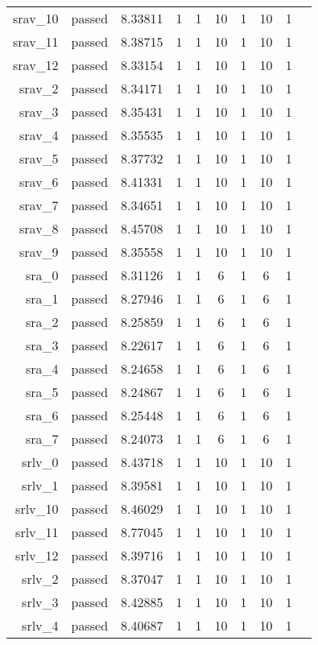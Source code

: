 \begin{longtable}{r|ccccccccc}
    srav\_10 & passed & 8.33811 & 1 & 1 & 10 & 1 & 10 & 1 \\
    srav\_11 & passed & 8.38715 & 1 & 1 & 10 & 1 & 10 & 1 \\
    srav\_12 & passed & 8.33154 & 1 & 1 & 10 & 1 & 10 & 1 \\
    srav\_2 & passed & 8.34171 & 1 & 1 & 10 & 1 & 10 & 1 \\
    srav\_3 & passed & 8.35431 & 1 & 1 & 10 & 1 & 10 & 1 \\
    srav\_4 & passed & 8.35535 & 1 & 1 & 10 & 1 & 10 & 1 \\
    srav\_5 & passed & 8.37732 & 1 & 1 & 10 & 1 & 10 & 1 \\
    srav\_6 & passed & 8.41331 & 1 & 1 & 10 & 1 & 10 & 1 \\
    srav\_7 & passed & 8.34651 & 1 & 1 & 10 & 1 & 10 & 1 \\
    srav\_8 & passed & 8.45708 & 1 & 1 & 10 & 1 & 10 & 1 \\
    srav\_9 & passed & 8.35558 & 1 & 1 & 10 & 1 & 10 & 1 \\
    sra\_0 & passed & 8.31126 & 1 & 1 & 6 & 1 & 6 & 1 \\
    sra\_1 & passed & 8.27946 & 1 & 1 & 6 & 1 & 6 & 1 \\
    sra\_2 & passed & 8.25859 & 1 & 1 & 6 & 1 & 6 & 1 \\
    sra\_3 & passed & 8.22617 & 1 & 1 & 6 & 1 & 6 & 1 \\
    sra\_4 & passed & 8.24658 & 1 & 1 & 6 & 1 & 6 & 1 \\
    sra\_5 & passed & 8.24867 & 1 & 1 & 6 & 1 & 6 & 1 \\
    sra\_6 & passed & 8.25448 & 1 & 1 & 6 & 1 & 6 & 1 \\
    sra\_7 & passed & 8.24073 & 1 & 1 & 6 & 1 & 6 & 1 \\
    srlv\_0 & passed & 8.43718 & 1 & 1 & 10 & 1 & 10 & 1 \\
    srlv\_1 & passed & 8.39581 & 1 & 1 & 10 & 1 & 10 & 1 \\
    srlv\_10 & passed & 8.46029 & 1 & 1 & 10 & 1 & 10 & 1 \\
    srlv\_11 & passed & 8.77045 & 1 & 1 & 10 & 1 & 10 & 1 \\
    srlv\_12 & passed & 8.39716 & 1 & 1 & 10 & 1 & 10 & 1 \\
    srlv\_2 & passed & 8.37047 & 1 & 1 & 10 & 1 & 10 & 1 \\
    srlv\_3 & passed & 8.42885 & 1 & 1 & 10 & 1 & 10 & 1 \\
    srlv\_4 & passed & 8.40687 & 1 & 1 & 10 & 1 & 10 & 1 \\

\end{longtable}
